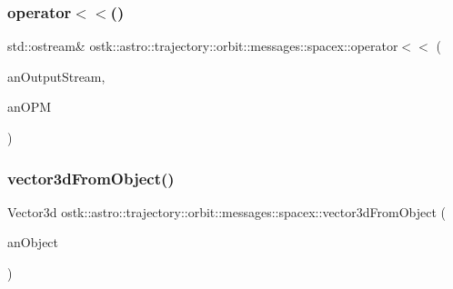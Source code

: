 \subsubsection{\texorpdfstring{operator$<$$<$()}{operator<<()}}
{\footnotesize\ttfamily std\+::ostream\& ostk\+::astro\+::trajectory\+::orbit\+::messages\+::spacex\+::operator$<$$<$ (\begin{DoxyParamCaption}\item[{std\+::ostream \&}]{an\+Output\+Stream,  }\item[{const \hyperlink{classostk_1_1astro_1_1trajectory_1_1orbit_1_1messages_1_1spacex_1_1_o_p_m}{O\+PM} \&}]{an\+O\+PM }\end{DoxyParamCaption})}

\mbox{\label{namespaceostk_1_1astro_1_1trajectory_1_1orbit_1_1messages_1_1spacex_a446464b600a98d6f017ec719fe302350}} 
\subsubsection{\texorpdfstring{vector3d\+From\+Object()}{vector3dFromObject()}}
{\footnotesize\ttfamily Vector3d ostk\+::astro\+::trajectory\+::orbit\+::messages\+::spacex\+::vector3d\+From\+Object (\begin{DoxyParamCaption}\item[{const ctnr\+::\+Object \&}]{an\+Object }\end{DoxyParamCaption})}

